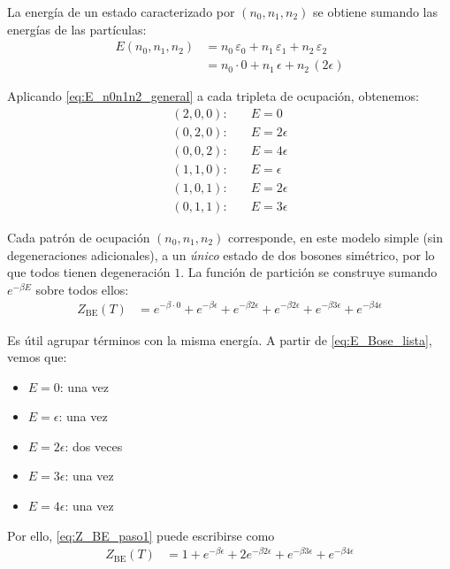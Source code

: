 \documentclass{article}
\begin{document}
La energía de un estado caracterizado por \((n_{0},n_{1},n_{2})\) se obtiene sumando
las energías de las partículas:
\begin{equation}
\begin{split}
E(n_{0},n_{1},n_{2})
&= n_{0}\,\varepsilon_{0} + n_{1}\,\varepsilon_{1} + n_{2}\,\varepsilon_{2} \\[4pt]
&= n_{0}\cdot 0 + n_{1}\,\epsilon + n_{2}\,(2\epsilon)
\end{split}\label{eq:E_n0n1n2_general}
\end{equation}

Aplicando \eqref{eq:E_n0n1n2_general} a cada tripleta de ocupación, obtenemos:
\begin{equation}
\begin{split}
(2,0,0):\quad &E = 0 \\[4pt]
(0,2,0):\quad &E = 2\epsilon \\[4pt]
(0,0,2):\quad &E = 4\epsilon \\[4pt]
(1,1,0):\quad &E = \epsilon \\[4pt]
(1,0,1):\quad &E = 2\epsilon \\[4pt]
(0,1,1):\quad &E = 3\epsilon
\end{split}\label{eq:E_Bose_lista}
\end{equation}

Cada patrón de ocupación \((n_{0},n_{1},n_{2})\) corresponde, en este modelo simple
(sin degeneraciones adicionales), a un \emph{único} estado de dos bosones simétrico,
por lo que todos tienen degeneración \(1\). La función de partición se construye
sumando \(e^{-\beta E}\) sobre todos ellos:
\begin{equation}
\begin{split}
Z_{\text{BE}}(T)
&= e^{-\beta\cdot 0}
 + e^{-\beta\epsilon}
 + e^{-\beta 2\epsilon}
 + e^{-\beta 2\epsilon}
 + e^{-\beta 3\epsilon}
 + e^{-\beta 4\epsilon}
\end{split}\label{eq:Z_BE_paso1}
\end{equation}

Es útil agrupar términos con la misma energía. A partir de \eqref{eq:E_Bose_lista},
vemos que:
\begin{itemize}
    \item[$\bullet$] \(E=0\): una vez  
    \item[$\bullet$] \(E=\epsilon\): una vez  
    \item[$\bullet$] \(E=2\epsilon\): dos veces  
    \item[$\bullet$] \(E=3\epsilon\): una vez  
    \item[$\bullet$] \(E=4\epsilon\): una vez
\end{itemize}
Por ello, \eqref{eq:Z_BE_paso1} puede escribirse como
\begin{equation}
\begin{split}
Z_{\text{BE}}(T)
&= 1
 + e^{-\beta\epsilon}
 + 2e^{-\beta 2\epsilon}
 + e^{-\beta 3\epsilon}
 + e^{-\beta 4\epsilon}
\end{split}\label{eq:Z_BE_paso2}
\end{equation}
\end{document}
